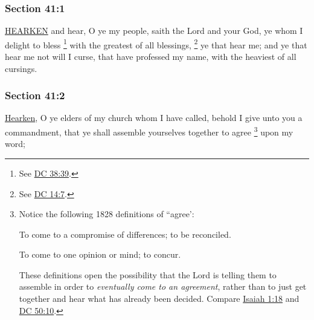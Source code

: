 	\subsubsection{Section 41:1} %
		\label{DC41-1}

		\hyperref[HEARKEN]{HEARKEN} and hear, O ye my people, saith the Lord and your God, ye whom I delight to bless%
			\footnote{%
				See \hyperref[DC38-39]{DC 38:39}.
				}
		with the greatest of all blessings,%
			\footnote{%
				See \hyperref[DC14-7]{DC 14:7}.
				}
		ye that hear me; and ye that hear me not will I curse, that have professed my name, with the heaviest of all cursings.


	\subsubsection{Section 41:2} %
		\label{DC41-2}

		\hyperref[HEARKEN]{Hearken}, O ye elders of my church whom I have called, behold I give unto you a commandment, that ye shall assemble yourselves together to agree%
			\footnote{%
				Notice the following 1828 definitions of ``agree':
					\begin{compactitem}
						\item[5] To come to a compromise of differences; to be reconciled.
						\item[6] To come to one opinion or mind; to concur.
					\end{compactitem}
				These definitions open the possibility that the Lord is telling them to assemble in order to \textit{eventually come to an agreement}, rather than to just get together and hear what has already been decided. Compare \hyperref[ISAIAH-1-18]{Isaiah 1:18} and \hyperref[DC50-10]{DC 50:10}.
				}
		upon my word;


